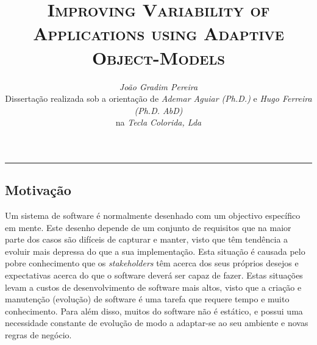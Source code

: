 \documentclass[9pt,a4paper]{extarticle}
\begin{document}
\title{\vspace*{-8mm}\textbf{\textsc{Improving Variability of Applications using Adaptive Object-Models}}}
\author{\emph{João Gradim Pereira}\\[2mm]
\small{Dissertação realizada sob a orientação de \emph{Ademar Aguiar (Ph.D.)} e \emph{Hugo Ferreira (Ph.D. AbD)}}\\
\small{na \emph{Tecla Colorida, Lda}}}
\date{}
\maketitle
\thispagestyle{empty}

\vspace*{-4mm}\noindent\rule{\textwidth}{0.4pt}\vspace*{4mm}

\begin{multicols}{2}

\section{Motivação}\label{sec:motivation}


Um sistema de software é normalmente desenhado com um objectivo específico em mente. Este desenho depende de um conjunto de requisitos que na maior parte dos casos são difíceis de capturar e manter, visto que têm tendência a evoluir mais depressa do que a sua implementação. Esta situação é causada pelo pobre conhecimento que os \emph{stakeholders} têm acerca dos seus próprios desejos e expectativas acerca do que o software deverá ser capaz de fazer. Estas situações levam a custos de desenvolvimento de software mais altos, visto que a criação e manutenção (evolução) de software é uma tarefa que requere tempo e muito conhecimento. Para além disso, muitos do software não é estático, e possui uma necessidade constante de evolução de modo a adaptar-se ao seu ambiente e novas regras de negócio.


\end{multicols}
\end{document}
